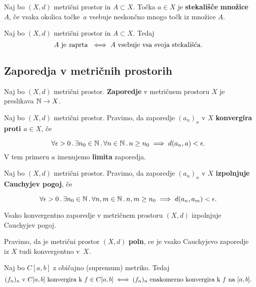 \begin{definicija}
    Naj bo $(X, d)$ metrični prostor in $A \subset X$. Točka $a \in X$ je \textbf{stekališče množice} $A$, če vsaka okolica točke~$a$ vsebuje neskončno mnogo točk iz množice $A$.
\end{definicija}

\begin{trditev}
    Naj bo $(X, d)$ metrični prostor in $A \subset X$. Tedaj 
    $$A \text{ je zaprta } \iff A \text{ vsebuje vsa svoja stekališča}.$$
\end{trditev}

\subsection*{Zaporedja v metričnih prostorih}
\begin{definicija}
    Naj bo $(X, d)$ metrični prostor. \textbf{Zaporedje} v metričnem prostoru $X$ je preslikava $\mathbb{N} \to X$.
\end{definicija}

\begin{definicija}
    Naj bo $(X, d)$ metrični prostor. Pravimo, da zaporedje $(a_n)_n$ v $X$ \textbf{konvergira proti $a \in X$}, če

    $$\forall \epsilon > 0 \,.\, \exists n_0 \in \mathbb{N} \,.\, \forall n \in \mathbb{N} \,.\, n \geq n_0 \implies d(a_n, a) < \epsilon.$$
    V tem primeru $a$ imenujemo \textbf{limita} zaporedja.
\end{definicija}

\begin{definicija}
    Naj bo $(X, d)$ metrični prostor. Pravimo, da zaporedje $(a_n)_n$ v $X$ \textbf{izpolnjuje Cauchyjev pogoj}, če

    $$\forall \epsilon > 0 \,.\, \exists n_0 \in \mathbb{N} \,.\, \forall n, m \in \mathbb{N} \,.\, n, m \geq n_0 \implies d(a_n, a_m) < \epsilon.$$
\end{definicija}

\begin{izrek}
    Vsako konvergentno zaporedje v metričnem prostoru $(X, d)$ izpolnjuje Cauchyjev pogoj.
\end{izrek}

\begin{definicija}
    Pravimo, da je metrični prostor $(X, d)$ \textbf{poln}, ce je vsako Cauchyjevo zaporedje iz $X$ tudi konvergentno v~$X$.
\end{definicija}

\begin{izrek}
    Naj bo $C[a,b]$ z običajno (supremum) metriko. Tedaj 
    $$(f_n)_n \text{ v } C[a,b] \text{ konvergira k } f \in C[a,b] \iff (f_n)_n \text{ enakomerno konvergira k } f \text{ na } [a, b].$$
\end{izrek}

